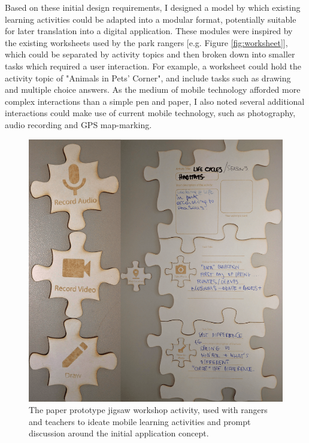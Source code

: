 Based on these initial design requirements, I designed a model by which existing learning activities could be adapted into a modular format, potentially suitable for later translation into a digital application. These modules were inspired by the existing worksheets used by the park rangers [e.g. Figure \ref{fig:worksheet}], which could be separated by activity topics and then broken down into smaller tasks which required a user interaction. For example, a worksheet could hold the activity topic of "Animals in Pets' Corner", and include tasks such as drawing and multiple choice answers. As the medium of mobile technology afforded more complex interactions than a simple pen and paper, I also noted several additional interactions could make use of current mobile technology, such as photography, audio recording and GPS map-marking.

\begin{figure}
  \centering
  \includegraphics[width=0.75\columnwidth]{images/chapter04/rangerJigsaw.png}
  \caption[The jigsaw prototyping activity]{The paper prototype jigsaw workshop activity, used with rangers and teachers to ideate mobile learning activities and prompt discussion around the initial application concept.}
  \label{fig:rangerJigsaw}
\end{figure}

